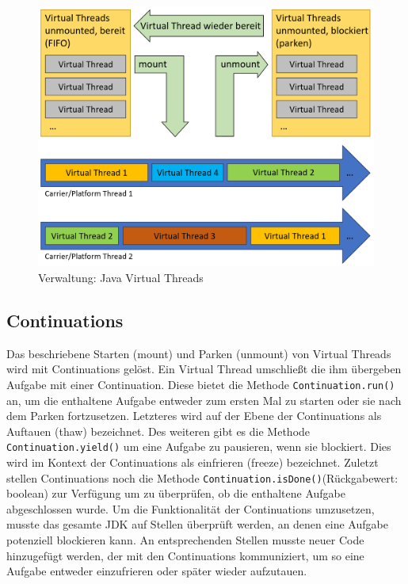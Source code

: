 \documentclass[fontsize=12pt,paper=a4,twoside=semi,parskip=half-,headsepline,headinclude]{scrreprt}
\newcommand{\code}[1]{\texttt{#1}}
\begin{document}
\begin{figure}[h]
	\centering
	\includegraphics[scale=0.5]{figures/VirtualThreadsAblauf.png}
	\caption{Verwaltung: Java Virtual Threads}
	\label{fig:VirtualThreadsAblauf}
\end{figure}

\subsection{Continuations}

Das beschriebene Starten (mount) und Parken (unmount) von Virtual Threads wird mit Continuations gelöst. Ein Virtual Thread umschließt die ihm übergeben Aufgabe mit einer Continuation. Diese bietet die Methode \code{Continuation.run()} an, um die enthaltene Aufgabe entweder zum ersten Mal zu starten oder sie nach dem Parken fortzusetzen. Letzteres wird auf der Ebene der Continuations als Auftauen (thaw) bezeichnet. Des weiteren gibt es die Methode \code{Continuation.yield()} um eine Aufgabe zu pausieren, wenn sie blockiert. Dies wird im Kontext der Continuations als einfrieren (freeze) bezeichnet. Zuletzt stellen Continuations noch die Methode \code{Continuation.isDone()}(Rückgabewert: boolean) zur Verfügung um zu überprüfen, ob die enthaltene Aufgabe abgeschlossen wurde. Um die Funktionalität der Continuations umzusetzen, musste das gesamte JDK auf Stellen überprüft werden, an denen eine Aufgabe potenziell blockieren kann. An entsprechenden Stellen musste neuer Code hinzugefügt werden, der mit den Continuations kommuniziert, um so eine Aufgabe entweder einzufrieren oder später wieder aufzutauen.\cite{Pressler2023b}
\end{document}
